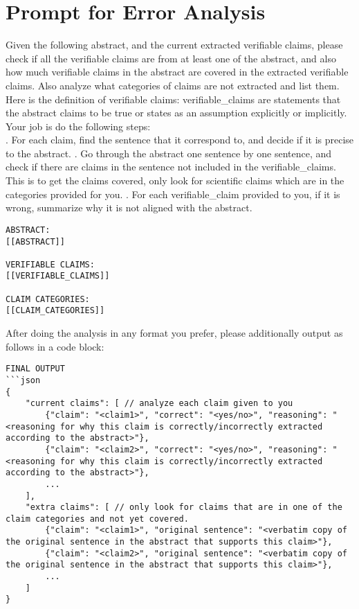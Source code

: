\section{Prompt for Error Analysis}
\label{appendix:error_analysis_prompt}
\begin{mdframed}[backgroundcolor=blue!20]
\noindent Given the following abstract, and the current extracted verifiable claims, please check if all the verifiable claims are from at least one of the abstract, and also how much verifiable claims in the abstract are covered in the extracted verifiable claims. Also analyze what categories of claims are not extracted and list them.\\

\noindent Here is the definition of verifiable claims: verifiable\_claims are statements that the abstract claims to be true or states as an assumption explicitly or implicitly.\\

\noindent Your job is do the following steps:\\
. For each claim, find the sentence that it correspond to, and decide if it is precise to the abstract.
. Go through the abstract one sentence by one sentence, and check if there are claims in the sentence not included in the verifiable\_claims. This is to get the claims covered, only look for scientific claims which are in the categories provided for you.
. For each verifiable\_claim provided to you, if it is wrong, summarize why it is not aligned with the abstract.
\begin{lstlisting}
ABSTRACT:
[[ABSTRACT]]

VERIFIABLE CLAIMS:
[[VERIFIABLE_CLAIMS]]

CLAIM CATEGORIES:
[[CLAIM_CATEGORIES]]
\end{lstlisting}
After doing the analysis in any format you prefer, please additionally output as follows in a code block:\\

\begin{lstlisting}
FINAL OUTPUT
```json
{
    "current claims": [ // analyze each claim given to you
        {"claim": "<claim1>", "correct": "<yes/no>", "reasoning": "<reasoning for why this claim is correctly/incorrectly extracted according to the abstract>"},
        {"claim": "<claim2>", "correct": "<yes/no>", "reasoning": "<reasoning for why this claim is correctly/incorrectly extracted according to the abstract>"},
        ...
    ],
    "extra claims": [ // only look for claims that are in one of the claim categories and not yet covered.
        {"claim": "<claim1>", "original sentence": "<verbatim copy of the original sentence in the abstract that supports this claim>"},
        {"claim": "<claim2>", "original sentence": "<verbatim copy of the original sentence in the abstract that supports this claim>"},
        ...
    ]
}
\end{lstlisting}
\end{mdframed}